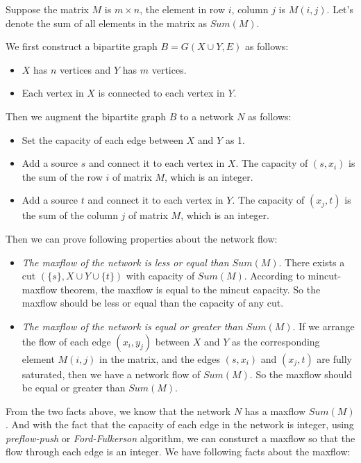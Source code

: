 
Suppose the matrix $M$ is $m \times n$, the element in row $i$, column $j$ is $M(i, j)$. Let's denote the sum of all elements in the matrix as $Sum(M)$.

We first construct a bipartite graph $B = G(X \cup Y, E)$ as follows:

\begin{itemize}
  \item $X$ has $n$ vertices and $Y$ has $m$ vertices.
  \item Each vertex in $X$ is connected to each vertex in $Y$.
\end{itemize}

Then we augment the bipartite graph $B$ to a network $N$ as follows:

\begin{itemize}
  \item Set the capacity of each edge between $X$ and $Y$ as 1.
  \item Add a source $s$ and connect it to each vertex in $X$. The capacity of $(s, x_i)$ is the sum of the row $i$ of matrix $M$, which is an integer.
  \item Add a source $t$ and connect it to each vertex in $Y$. The capacity of $(x_j, t)$ is the sum of the column $j$ of matrix $M$, which is an integer.
\end{itemize}

Then we can prove following properties about the network flow:

\begin{itemize}
  \item \textit{The maxflow of the network is less or equal than $Sum(M)$}. There exists a cut $(\{s\}, X \cup Y \cup \{t\})$ with capacity of $Sum(M)$. According to mincut-maxflow theorem, the maxflow is equal to the mincut capacity. So the maxflow should be less or equal than the capacity of any cut.
  \item \textit{The maxflow of the network is equal or greater than $Sum(M)$}. If we arrange the flow of each edge $(x_i, y_j)$ between $X$ and $Y$ as the corresponding element $M(i, j)$ in the matrix, and the edges $(s, x_i)$ and $(x_j, t)$ are fully saturated, then we have a network flow of $Sum(M)$. So the maxflow should be equal or greater than $Sum(M)$.
\end{itemize}

From the two facts above, we know that the network $N$ has a maxflow $Sum(M)$. And with the fact that the capacity of each edge in the network is integer, using \textit{preflow-push} or \textit{Ford-Fulkerson} algorithm, we can consturct a maxflow so that the flow through each edge is an integer. We have following facts about the maxflow:

